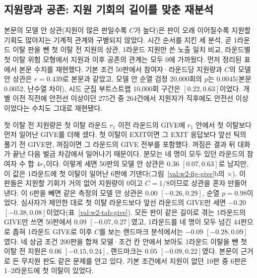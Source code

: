\subsection{지원량과 공존: 지원 기회의 길이를 맞춘 재분석}\label{val:w2-give-c}

본문의 모델 안 상관(지원이 많은 판일수록 $C$가 높다)은 판이 오래 이어질수록 지원할 기회도 많아지는 기계적 관계와 구별되지 않았다. 시간 순서를 지킨 세 분석, 곧 1라운드 이탈 판을 뺀 첫 이탈 전 지원의 상관, 1라운드 지원만 쓴 노출 일치 비교, 라운드별 첫 이탈 위험 모형에서 지원과 이후 공존의 관계는 모두 0에 가까웠다. 먼저 정리된 표에서 본문 수치를 재현했다. 기본 조건 50판에서 참여자·라운드당 지원량과 $C$의 모델 안 상관은 $r=0.439$로 본문과 같았고, 모델 안 순열 검정 20,000회의 $p$는 0.0045(본문 0.0052, 난수열 차이), 시드 군집 부트스트랩 10,000회 구간은 $[0.22, 0.63]$이었다. 개별 이전 직전에 안전선 이상이던 275건 중 264건에서 지원자가 직후에도 안전선 이상이었다는 수치도 그대로 재현됐다.

첫 이탈 전 지원량은 첫 이탈 라운드 $r_1$ 이전 라운드의 GIVE에 $r_1$ 안에서 첫 이탈보다 먼저 일어난 GIVE를 더해 셌다. 첫 이탈이 EXIT이면 그 EXIT 응답보다 앞선 틱의 풀기 전 GIVE만, 꺼짐이면 그 라운드의 GIVE 전부를 포함했다. 꺼짐은 결과 뒤 대화가 끝난 다음 벌금 차감에서 일어나기 때문이다. 분모는 네 명이 모두 있던 라운드의 참여자 수 합 $4r_1$이다. 이렇게 세면 50판의 모델 안 상관은 $0.36$ $[0.07, 0.63]$로 남지만, 이 값은 1라운드에 첫 이탈이 일어난 6판에 기댄다(그림~\ref{val:w2-fig-give}b의 $\times$). 이 판들은 지원할 기회가 거의 없어 지원량이 0이고 $C=1/8$이므로 상관을 혼자 만들어 낸다. 이 6판을 빼면 같은 측정의 모델 안 상관은 $0.00$ $[-0.26, 0.29]$, 순열 $p=0.98$이었다. 심사자가 제안한 대로 첫 이탈 라운드보다 앞선 라운드의 GIVE만 세면 $-0.20$ $[-0.38, 0.08]$이었다(표~\ref{val:w2-tab-give}). 모든 판이 같은 길이로 겪는 1라운드의 GIVE만 쓰면 50판에서 $0.09$ $[-0.07, 0.27]$였고, 1라운드를 네 명이 모두 넘긴 44판으로 좁혀 1라운드 GIVE로 이후 $C$를 보는 랜드마크 분석에서는 $-0.09$ $[-0.28, 0.09]$였다. 네 상금 조건 200판을 합쳐 모델·조건 칸 안에서 보아도 1라운드 이탈을 뺀 첫 이탈 전 지원은 $0.06$ $[-0.15, 0.24]$, 랜드마크는 $0.05$ $[-0.09, 0.22]$였다. 본문이 근거로 든 무지원 판도 같은 문제를 안고 있다. 기본 조건에서 지원이 없던 10판 중 6판은 1--2라운드에 첫 이탈이 있었다.


